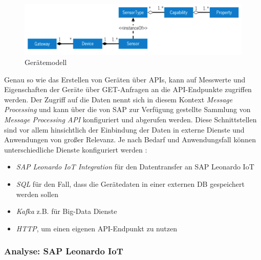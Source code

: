 \begin{figure}[ht!]
  \centering
  \includegraphics[width=1.0\linewidth]{pictures/device_model}
  \caption[Gerätemodell]{Gerätemodell}
  \label{fig:devicemodel}
\end{figure}

\noindent Genau so wie das Erstellen von Geräten über APIs, kann auf Messwerte und Eigenschaften der Geräte über GET-Anfragen an die API-Endpunkte zugriffen werden. Der Zugriff auf die Daten nennt sich in diesem  Kontext \textit{Message Processing} und kann über die von SAP zur Verfügung gestellte Sammlung von \textit{Message Processing API} konfiguriert und abgerufen werden. Diese Schnittstellen sind vor allem hinsichtlich der Einbindung der Daten in externe Dienste und Anwendungen von großer Relevanz. Je nach Bedarf und Anwendungsfall können unterschiedliche Dienste konfiguriert werden \citep{SAP2020}:
\begin{itemize}
  \item \textit{SAP Leonardo IoT Integration} für den Datentransfer an SAP Leonardo IoT
  \item \textit{SQL} für den Fall, dass die Gerätedaten in einer externen DB gespeichert werden sollen
  \item \textit{Kafka} z.B. für Big-Data Dienste
  \item \textit{HTTP}, um einen eigenen API-Endpunkt zu nutzen
\end{itemize}

\subsubsection{Analyse: SAP Leonardo IoT}

